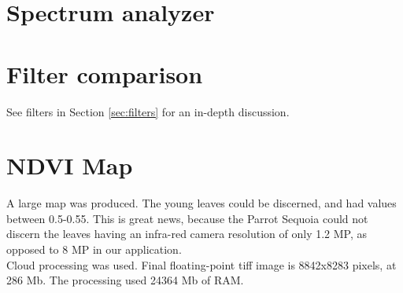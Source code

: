 \begin{appendices}
\chapter{Spectrum analyzer}

\chapter{Filter comparison}
\label{app:filter_comparison}

See filters in Section \ref{sec:filters} for an in-depth discussion.

\chapter{NDVI Map}
\label{app:ndvi_map}

A large map was produced. The young leaves could be discerned, and had values between 0.5-0.55. This is great news, because the Parrot Sequoia could not discern the leaves having an infra-red camera resolution of only 1.2 MP, as opposed to 8 MP in our application.\\

Cloud processing was used. Final floating-point tiff image is 8842x8283 pixels, at 286 Mb. The processing used 24364 Mb of RAM.\\


\end{appendices}
